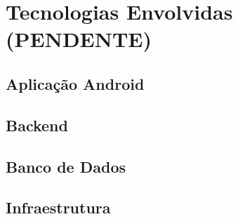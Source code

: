 \chapter{Tecnologias Envolvidas (PENDENTE)} \label{cha:tecnologias-envolvidas}
\section{Aplicação Android}
\section{Backend}
\section{Banco de Dados}
\section{Infraestrutura}

